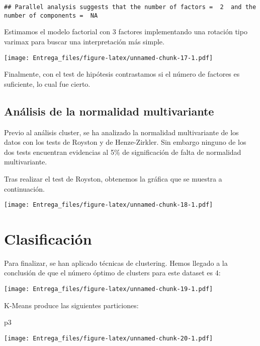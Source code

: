 \documentclass[
]{scrreprt}
\newenvironment{Shaded}{\begin{snugshade}}{\end{snugshade}}
\newcommand{\NormalTok}[1]{#1}
\begin{document}
\begin{verbatim}
## Parallel analysis suggests that the number of factors =  2  and the number of components =  NA
\end{verbatim}

Estimamos el modelo factorial con 3 factores implementando una rotación
tipo varimax para buscar una interpretación más simple.

\texttt{[image: Entrega\_files/figure-latex/unnamed-chunk-17-1.pdf]}

Finalmente, con el test de hipótesis contrastamos si el número de
factores es suficiente, lo cual fue cierto.

\hypertarget{anuxe1lisis-de-la-normalidad-multivariante}{%
\subsection{Análisis de la normalidad
multivariante}\label{anuxe1lisis-de-la-normalidad-multivariante}}

Previo al análisis cluster, se ha analizado la normalidad multivariante
de los datos con los tests de Royston y de Henze-Zirkler. Sin embargo
ninguno de los dos tests encuentran evidencias al 5\% de significación
de falta de normalidad multivariante.

Tras realizar el test de Royston, obtenemos la gráfica que se muestra a
continuación.

\texttt{[image: Entrega\_files/figure-latex/unnamed-chunk-18-1.pdf]}

\hypertarget{clasificaciuxf3n}{%
\section{Clasificación}\label{clasificaciuxf3n}}

Para finalizar, se han aplicado técnicas de clustering. Hemos llegado a
la conclusión de que el número óptimo de clusters para este dataset es
4:

\texttt{[image: Entrega\_files/figure-latex/unnamed-chunk-19-1.pdf]}

K-Means produce las siguientes particiones:

\begin{Shaded}
\begin{Highlighting}[]
\NormalTok{p3}
\end{Highlighting}
\end{Shaded}

\texttt{[image: Entrega\_files/figure-latex/unnamed-chunk-20-1.pdf]}
\end{document}
